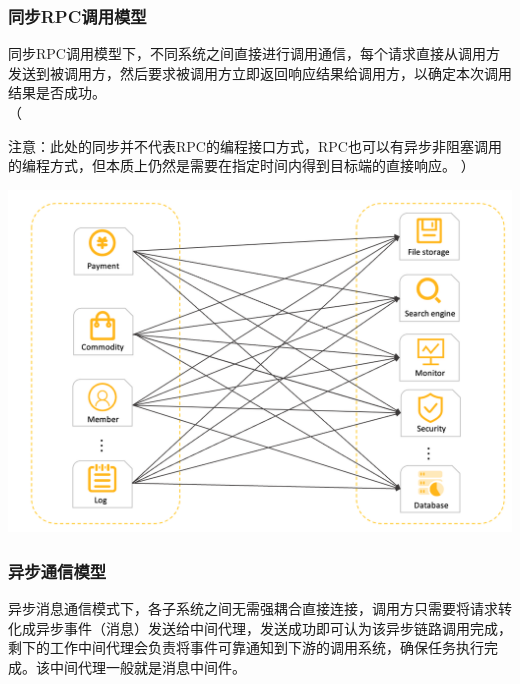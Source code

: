 \documentclass[11pt, a4paper, oneside, fontset=none]{ctexbook}
\newenvironment{ignore}{%
  \color{gray}%
  \ignorespaces%
  （%
}{%
  ）%
  \ignorespacesafterend%
}
\begin{document}
\subsubsection{同步RPC调用模型}
同步RPC调用模型下，不同系统之间直接进行调用通信，每个请求直接从调用方发送到被调用方，然后要求被调用方立即返回响应结果给调用方，以确定本次调用结果是否成功。\\
\begin{ignore}
  注意：此处的同步并不代表RPC的编程接口方式，RPC也可以有异步非阻塞调用的编程方式，但本质上仍然是需要在指定时间内得到目标端的直接响应。
\end{ignore}

\begin{center}
  \begin{minipage}{\textwidth}
    \center
    \includegraphics[width=\textwidth]{picture/同步RPC调用模型.png}
    \captionsetup{hypcap=false}
    \label{fig:同步RPC调用模型}
  \end{minipage}
\end{center}

\subsubsection{异步通信模型}
异步消息通信模式下，各子系统之间无需强耦合直接连接，调用方只需要将请求转化成异步事件（消息）发送给中间代理，发送成功即可认为该异步链路调用完成，剩下的工作中间代理会负责将事件可靠通知到下游的调用系统，确保任务执行完成。该中间代理一般就是消息中间件。
\end{document}
